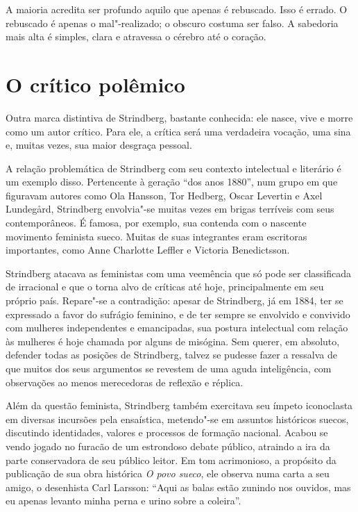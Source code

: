 \begin{hedraquote}
A maioria acredita ser profundo aquilo que apenas é rebuscado. Isso é
errado. O rebuscado é apenas o mal"-realizado; o obscuro costuma ser
falso. A sabedoria mais alta é simples, clara e atravessa o cérebro até
o coração.
\end{hedraquote}

\section{O crítico polêmico}

Outra marca distintiva de Strindberg, bastante conhecida: ele
nasce, vive e morre como um autor crítico. Para ele, a crítica será uma
verdadeira vocação, uma sina e, muitas vezes, sua maior desgraça pessoal. 

A relação problemática de Strindberg com seu contexto intelectual e
literário é um exemplo disso. Pertencente à geração “dos anos 1880”, 
num grupo em que figuravam autores como Ola Hansson, Tor Hedberg,
Oscar Levertin e Axel Lundegård, Strindberg envolvia"-se muitas vezes em
brigas terríveis com seus contemporâneos. É famosa, por exemplo, sua
contenda com o nascente movimento feminista sueco. Muitas de suas
integrantes eram escritoras importantes, como Anne Charlotte
Leffler e Victoria Benedictsson. 

Strindberg atacava as feministas com
uma veemência que só pode ser classificada de irracional e que o torna alvo de 
críticas até hoje, principalmente em seu próprio país. Repare"-se a contradição: apesar de
Strindberg, já em 1884, ter se expressado a favor do sufrágio feminino, e de ter sempre 
se envolvido e convivido com mulheres independentes e emancipadas, 
sua postura intelectual com relação às mulheres é
hoje chamada por alguns de misógina. Sem querer,
em absoluto, defender todas as posições de Strindberg, talvez se pudesse fazer a
ressalva de que muitos dos seus argumentos se revestem de uma aguda inteligência,
com observações ao menos merecedoras de reflexão e réplica.

Além da questão feminista, Strindberg também exercitava seu ímpeto 
iconoclasta em diversas incursões pela ensaística, metendo"-se em assuntos
históricos suecos, discutindo identidades, valores e processos de
formação nacional. Acabou se vendo jogado no furacão de um estrondoso debate
público, atraindo a ira da parte conservadora de seu público leitor. Em
tom acrimonioso, a propósito da publicação de sua obra histórica
\textit{O povo sueco}, ele observa numa carta a seu amigo, o
desenhista Carl Larsson: “Aqui as balas estão zunindo nos
ouvidos, mas eu apenas levanto minha perna e urino sobre a coleira”. 

